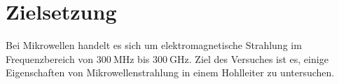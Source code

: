 \section{Zielsetzung}
\label{sec:zielsetzung}

Bei Mikrowellen handelt es sich um elektromagnetische Strahlung im Frequenzbereich von $\SI{300}{\mega\hertz}$ bis $\SI{300}{\giga\hertz}$.
Ziel des Versuches ist es, einige Eigenschaften von Mikrowellenstrahlung in einem Hohlleiter zu untersuchen.